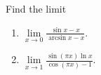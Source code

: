 Find the limit
\begin{enumerate}
\item $\lim\limits_{x\to 0} \frac{\sin x-x }{\arcsin x-x } $.
\item $\lim\limits_{x\to 1} \frac{\sin \left(\pi x\right)\ln x }{\cos(\pi x)-1 } $.
\end{enumerate}